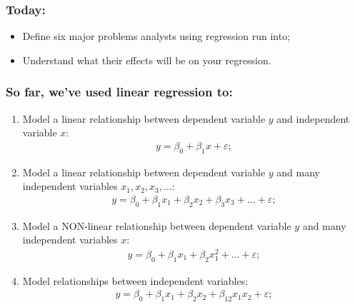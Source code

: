 \documentclass[aspectratio=169]{beamer}
\theoremstyle{principle}
\begin{document}
\begin{frame}
\frametitle{Today:}

\begin{itemize}
\item Define six major problems analysts using regression run into;
\bigskip
\bigskip
\bigskip

\item Understand what their effects will be on your regression.

\end{itemize}

\end{frame}

\begin{frame}
\frametitle{So far, we've used linear regression to:}

\begin{enumerate} 
\item Model a linear relationship between dependent variable $y$ and independent variable $x$:
\begin{align*}
y = \beta_0 + \beta_1x + \varepsilon;
\end{align*}

\item Model a linear relationship between dependent variable $y$ and many independent variables $x_1,x_2,x_3,\hdots$:
\begin{align*}
y = \beta_0 + \beta_1x_1 + \beta_2x_2 + \beta_3x_3 + \hdots + \varepsilon;
\end{align*}

\item Model a NON-linear relationship between dependent variable $y$ and many independent variables $x$:
\begin{align*}
y = \beta_0 + \beta_1x_1 + \beta_2x_1^2 + \hdots + \varepsilon;
\end{align*}

\item Model relationships between independent variables:
\begin{align*}
y = \beta_0 + \beta_1x_1 + \beta_2x_2 + \beta_{12}x_1x_2 + \varepsilon;
\end{align*}

\end{enumerate}

\end{frame}
\end{document}
